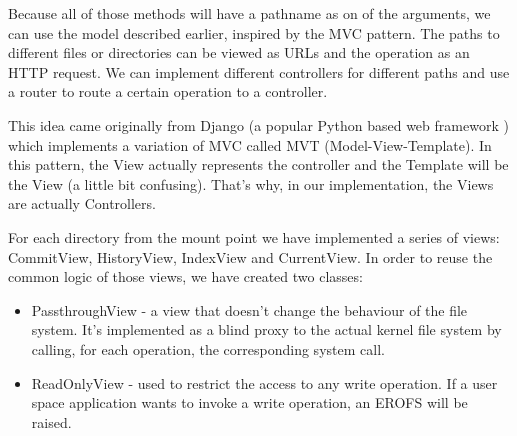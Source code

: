 Because all of those methods will have a pathname as on of the arguments, we can use the model described earlier, inspired by the MVC pattern. The paths to different files or directories can be viewed as URLs and the operation as an HTTP request. We can implement different controllers for different paths and use a router to route a certain operation to a controller.

This idea came originally from Django (a popular Python based web framework \cite{Django}) which implements a variation of MVC called MVT (Model-View-Template). In this pattern, the View actually represents the controller and the Template will be the View (a little bit confusing). That's why, in our implementation, the Views are actually Controllers.

For each directory from the mount point we have implemented a series of views: CommitView, HistoryView, IndexView and CurrentView. In order to reuse the common logic of those views, we have created two classes:

\begin{itemize}
    \item PassthroughView - a view that doesn't change the behaviour of the file system. It's implemented as a blind proxy to the actual kernel file system by calling, for each operation, the corresponding system call.
    \item ReadOnlyView - used to restrict the access to any write operation. If a user space application wants to invoke a write operation, an EROFS \cite{erofs} will be raised.
\end{itemize}

